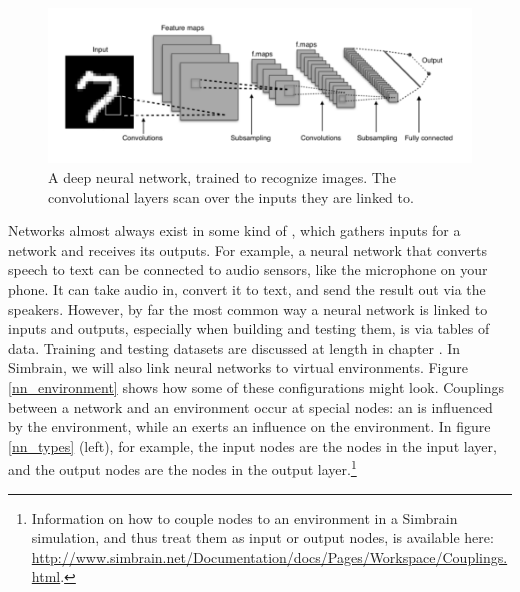 \begin{figure}[h]
\centering
\includegraphics[scale=.45]{./images/deepNet.png}
\caption[Adapted from a creative commons image by Aphex34 at \url{https://commons.wikimedia.org/wiki/File:Typical_cnn.png} ]{A deep neural network, trained to recognize images. The convolutional layers scan over the inputs they are linked to. }
\label{deep_net}
\end{figure}

Networks almost always exist in some kind of  , which gathers inputs for a network and receives its outputs. For example, a neural network that converts speech to text can be connected to audio sensors, like the microphone on your phone. It can take audio in, convert it to text, and send the result out via the speakers. However, by far the most common way a neural network is linked to inputs and outputs, especially when building and testing them, is via tables of data. Training and testing datasets are discussed at length in chapter . In Simbrain, we will also link neural networks to virtual environments. Figure \ref{nn_environment} shows how some of these configurations might look. Couplings between a network and an environment occur at special nodes:  an   is influenced by the environment, while an   exerts an influence on the environment. In figure \ref{nn_types} (left), for example, the input nodes are the nodes in the input layer, and the output nodes are the nodes in the output layer.\footnote{Information on how to couple nodes to an environment in a Simbrain simulation, and thus treat them as input or output nodes, is available here: \url{http://www.simbrain.net/Documentation/docs/Pages/Workspace/Couplings.html}.} 


